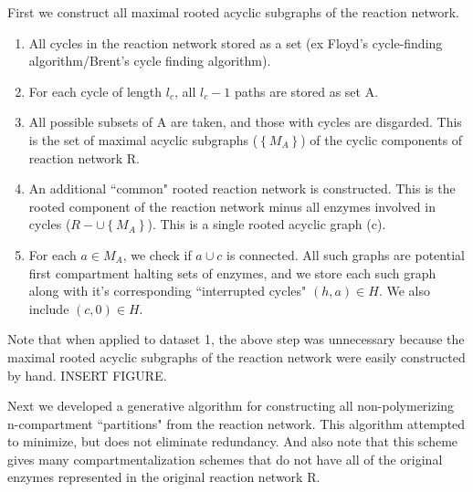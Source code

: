 \documentclass{article}
\begin{document}
First we construct all maximal rooted acyclic subgraphs of the reaction network. 
\begin{enumerate}
\item All cycles in the reaction network stored as a set (ex Floyd's cycle-finding algorithm/Brent's cycle finding algorithm).
\item For each cycle of length $l_c$, all $l_c-1$ paths are stored as set A. 
\item All possible subsets of A are taken, and those with cycles are disgarded. This is the set of maximal acyclic subgraphs ($\left\{M_A\right\}$) of the cyclic components of reaction network R.
\item An additional ``common" rooted reaction network is constructed. This is the rooted component of the reaction network minus all enzymes involved in cycles ($R - \cup \left\{ M_A \right\}$). This is a single rooted acyclic graph (c). 
\item For each $a\in M_A$, we check if $a\cup c$ is connected. All such graphs are potential first compartment halting sets of enzymes, and we store each such graph along with it's corresponding ``interrupted cycles" $(h,a)\in H$. We also include $(c,0)\in H$.
\end{enumerate}

Note that when applied to dataset 1, the above step was unnecessary because the  maximal rooted acyclic subgraphs of the reaction network were easily constructed by hand. INSERT FIGURE. 

Next we developed a generative algorithm for constructing all non-polymerizing n-compartment ``partitions" from the reaction network. This algorithm attempted to minimize, but does not eliminate redundancy. And also note that this scheme gives many compartmentalization schemes that do not have all of the original enzymes represented in the original reaction network R. 
\end{document}
